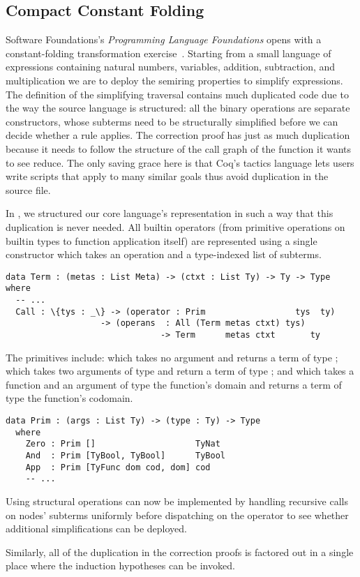 \subsection{Compact Constant Folding}
\label{sec:design:constants}

Software Foundations's \emph{Programming Language Foundations} opens with a constant-folding transformation exercise~\cite[Chapter~1]{Pierce:SF2}.
%
Starting from a small language of expressions containing natural numbers, variables, addition, subtraction, and multiplication we are to deploy the semiring properties to simplify expressions.
%
The definition of the simplifying traversal contains much duplicated code due to the way the source language is structured:
all the binary operations are separate constructors, whose subterms need to be structurally simplified before we can decide whether a rule applies.
%
The correction proof has just as much duplication because it needs to follow
the structure of the call graph of the function it wants to see reduce.
%
The only saving grace here is that Coq's tactics language lets users write scripts that apply to many similar goals thus avoid duplication in the source file.

In \Velo{}, we structured our core language's representation in such a way that
this duplication is never needed.
%
All builtin operators (from primitive operations on builtin types to function
application itself) are represented using a single  constructor
which takes an operation and a type-indexed list of subterms.

\begin{Verbatim}
data Term : (metas : List Meta) -> (ctxt : List Ty) -> Ty -> Type where
  -- ...
  Call : \{tys : _\} -> (operator : Prim                  tys  ty)
                   -> (operans  : All (Term metas ctxt) tys)
                               -> Term      metas ctxt       ty
\end{Verbatim}

The primitives include:
%
 which takes no argument and returns a term of type ;
%
 which takes two arguments of type  and return a term
of type ;
%
and
%
 which takes a function and an argument of type the function's domain
and returns a term of type the function's codomain.

\begin{Verbatim}
data Prim : (args : List Ty) -> (type : Ty) -> Type
  where
    Zero : Prim []                    TyNat
    And  : Prim [TyBool, TyBool]      TyBool
    App  : Prim [TyFunc dom cod, dom] cod
    -- ...
\end{Verbatim}

Using  structural operations can now be implemented by handling recursive calls on  nodes' subterms uniformly before dispatching on the operator to see whether additional simplifications can be deployed.

Similarly, all of the duplication in the correction proofs is factored out in a single place where the induction hypotheses can be invoked.


